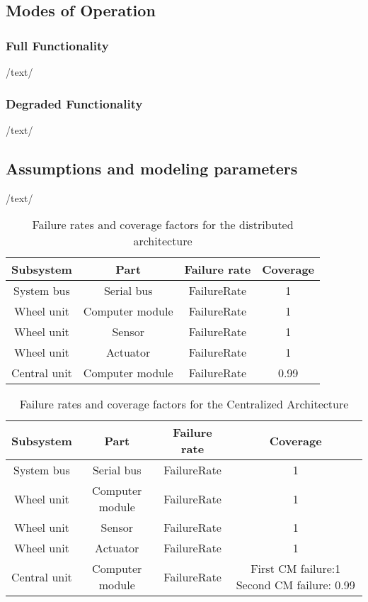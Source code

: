 \subsection{Modes of Operation}
\subsubsection{Full Functionality}
/text/
\subsubsection{Degraded Functionality}
/text/
\subsection{Assumptions and modeling parameters}
/text/
\begin{table}[h]
\centering
\begin{tabular}{| c | c | c | c |}
\hline 
Subsystem & Part & Failure rate & Coverage\\
\hline
System bus & Serial bus& FailureRate & 1\\
\hline
Wheel unit & Computer module & FailureRate & 1\\
\hline
Wheel unit & Sensor & FailureRate & 1\\
\hline
Wheel unit & Actuator & FailureRate & 1\\
\hline
Central unit & Computer module & FailureRate & 0.99\\
\hline
\end{tabular}
\caption{Failure rates and coverage factors for the distributed architecture}
\label{tab:Put a Lable}
\end{table}
\begin{table}[h]
\centering
\begin{tabular}{| c | c | c | c |}
\hline 
Subsystem & Part & Failure rate & Coverage\\
\hline
System bus & Serial bus& FailureRate & 1\\
\hline
Wheel unit & Computer module & FailureRate & 1\\
\hline
Wheel unit & Sensor & FailureRate & 1\\
\hline
Wheel unit & Actuator & FailureRate & 1\\
\hline
Central unit & Computer module & FailureRate & First CM failure:1 Second CM failure: 0.99\\
\hline
\end{tabular}
\caption{Failure rates and coverage factors for the Centralized Architecture}
\label{tab:Put a Lable}
\end{table}

